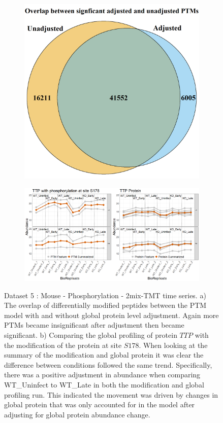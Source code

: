 \documentclass[mcp]{article}
\numberwithin{table}{section}
\begin{document}
\begin{figure}[h!]
\centering
\begin{subfigure}{\textwidth}
 \centering
\includegraphics[height=.5\textwidth]{images/shig_venn_diagramm.png}
\caption{}
\label{fig:data5_venn_diagram}
 \end{subfigure}
 \begin{subfigure}{\textwidth}
 \centering
	\includegraphics[width=1.0\textwidth]{images/No_Difference_Shigella_Profile_Plot}
	\caption{}
	\label{fig:data5_profile_plot}
	 \end{subfigure}
\caption{Dataset 5 : Mouse - Phosphorylation - 2mix-TMT time series. a) The overlap of differentially modified peptides between the PTM model with and without global protein level adjustment. Again more PTMs became insignificant after adjustment then became significant. b) Comparing the global profiling of protein $TTP$ with the modification of the protein at site $S178$. When looking at the summary of the modification and global protein it was clear the difference between conditions followed the same trend. Specifically, there was a positive adjustment in abundance when comparing WT\_Uninfect to WT\_Late in both the modification and global profiling run. This indicated the movement was driven by changes in global protein that was only accounted for in the model after adjusting for global protein abundance change.}
\label{fig:data5_plots}
\end{figure}
\end{document}
